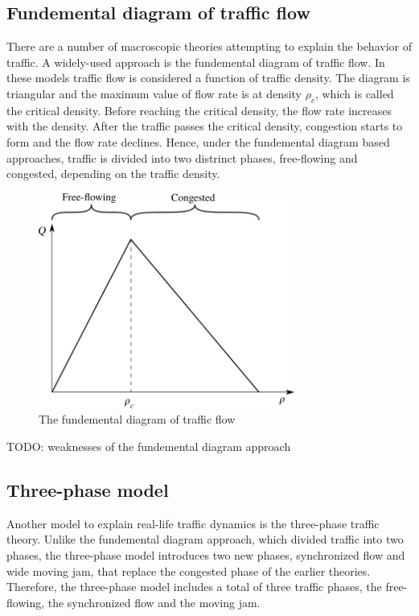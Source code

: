 \documentclass[english, 12pt, a4paper, elec, utf8, pdfa, online]{aaltothesis}
\begin{document}
\subsection{Fundemental diagram of traffic flow}

There are a number of macroscopic theories attempting to explain the behavior of traffic. A widely-used approach is the fundemental diagram of traffic flow. In these models traffic flow is considered a function of traffic density. The diagram is triangular and the maximum value of flow rate is at density $\rho_c$, which is called the critical density. Before reaching the critical density, the flow rate increases with the density. After the traffic passes the critical density, congestion starts to form and the flow rate declines. Hence, under the fundemental diagram based approaches, traffic is divided into two distrinct phases, free-flowing and congested, depending on the traffic density. \cite {lighthillwhitham}

\begin{figure}[h]
    \centering
    \includegraphics[width=0.75\textwidth]{graphs/fund_diagram}
    \caption{The fundemental diagram of traffic flow}
\end{figure}

TODO: weaknesses of the fundemental diagram approach

\subsection{Three-phase model}

Another model to explain real-life traffic dynamics is the three-phase traffic theory. Unlike the fundemental diagram approach, which divided traffic into two phases, the three-phase model introduces two new phases, synchronized flow and wide moving jam, that replace the congested phase of the earlier theories. Therefore, the three-phase model includes a total of three traffic phases, the free-flowing, the synchronized flow and the moving jam.
\end{document}
